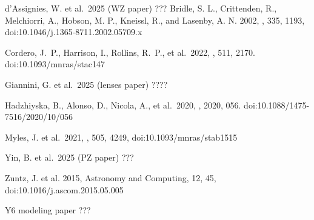 \documentclass[linenumbers, onecolumn]{aastex63}
\begin{document}
\begin{thebibliography}{dummy}
%
%
 d'Assignies, W. et al.\ 2025
  (WZ paper) ???
Bridle, S. L., Crittenden, R., Melchiorri, A., Hobson, M. P., Kneissl, R., and Lasenby, A. N. 2002, \mnras, 335, 1193, 
doi:10.1046/j.1365-8711.2002.05709.x
 
 Cordero, J.~P., Harrison, I., Rollins, R.~P., et al.\ 2022, \mnras, 511, 2170. doi:10.1093/mnras/stac147

 Giannini, G. et al.\ 2025
  (lenses paper) ????

 Hadzhiyska, B., Alonso, D., Nicola, A., et al.\ 2020, \jcap, 2020, 056. doi:10.1088/1475-7516/2020/10/056

  Myles, J. et al.\ 2021, \mnras, 505, 4249,
  doi:10.1093/mnras/stab1515
  
 Yin, B. et al.\ 2025 (PZ paper) ???
  
  Zuntz, J. et al. 2015, Astronomy and Computing, 12, 45,
  doi:10.1016/j.ascom.2015.05.005

  Y6 modeling paper ???
  
\end{thebibliography}
\end{document}
